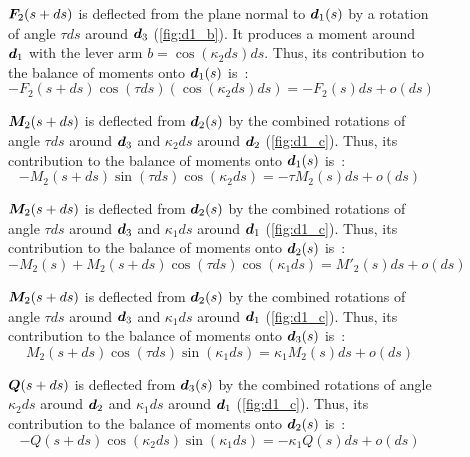 \begin{figure}[p]
\begin{fullpage}
	$\boldsymbol{F}_2(s+ds)$ is deflected from the plane normal to $\boldsymbol{d}_1(s)$ by a rotation of angle $\tau ds$ around $\boldsymbol{d}_3$ (\cref{fig:d1_b}). It produces a moment around $\boldsymbol{d}_1$ with the lever arm $b =  \cos(\kappa_2 ds) ds$. Thus, its contribution to the balance of moments onto $\boldsymbol{d}_1(s)$ is~:
	\begin{equation*}
		-F_2(s+ds) \cos(\tau ds) (\cos(\kappa_2 ds) ds) = -F_2(s) ds + o(ds)
	\end{equation*}

	$\boldsymbol{M}_2(s+ds)$ is deflected from $\boldsymbol{d}_2(s)$ by the combined rotations of angle $\tau ds$ around $\boldsymbol{d}_3$ and $\kappa_2 ds$ around $\boldsymbol{d}_2$ (\cref{fig:d1_c}). Thus, its contribution to the balance of moments onto $\boldsymbol{d}_1(s)$ is~:
	\begin{equation*}
		-M_2(s+ds) \sin(\tau ds) \cos(\kappa_2 ds) = -\tau M_2 (s) ds + o(ds)
	\end{equation*}

	$\boldsymbol{M}_2(s+ds)$ is deflected from $\boldsymbol{d}_2(s)$ by the combined rotations of angle $\tau ds$ around $\boldsymbol{d}_3$ and $\kappa_1 ds$ around $\boldsymbol{d}_1$ (\cref{fig:d1_c}). Thus, its contribution to the balance of moments onto $\boldsymbol{d}_2(s)$ is~:
	\begin{equation*}
		-M_2(s) + M_2(s+ds) \cos(\tau ds) \cos(\kappa_1 ds) = M'_2 (s) ds + o(ds)
	\end{equation*}

	$\boldsymbol{M}_2(s+ds)$ is deflected from $\boldsymbol{d}_2(s)$ by the combined rotations of angle $\tau ds$ around $\boldsymbol{d}_3$ and $\kappa_1 ds$ around $\boldsymbol{d}_1$ (\cref{fig:d1_c}). Thus, its contribution to the balance of moments onto $\boldsymbol{d}_3(s)$ is~:
	\begin{equation*}
		M_2(s+ds) \cos(\tau ds) \sin(\kappa_1 ds) = \kappa_1 M_2 (s) ds + o(ds)
	\end{equation*}

	$\boldsymbol{Q}(s+ds)$ is deflected from $\boldsymbol{d}_3(s)$ by the combined rotations of angle $\kappa_2 ds$ around $\boldsymbol{d}_2$ and $\kappa_1 ds$ around $\boldsymbol{d}_1$ (\cref{fig:d1_c}). Thus, its contribution to the balance of moments onto $\boldsymbol{d}_2(s)$ is~:
	\begin{equation*}
		-Q(s+ds) \cos(\kappa_2 ds) \sin(\kappa_1 ds) = -\kappa_1 Q(s) ds + o(ds)
	\end{equation*}
	  \end{fullpage}
\end{figure}


